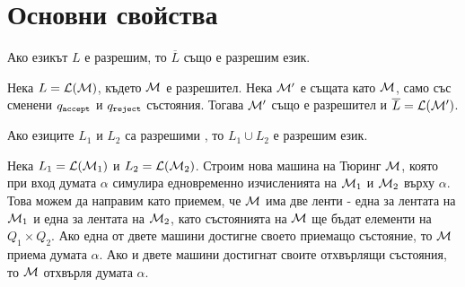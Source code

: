 \section{Основни свойства}

\begin{proposition}
  Ако езикът $L$ е разрешим, то $\overline{L}$ също е разрешим език.
\end{proposition}
\begin{hint}
  Нека $L = \mathcal{L}(\mathcal{M})$, където $\mathcal{M}$ е разрешител.
  Нека $\mathcal{M}'$ е същата като $\mathcal{M}$, само със сменени $q_{\texttt{accept}}$ и $q_{\texttt{reject}}$ състояния.
  Тогава $\mathcal{M}'$ също е разрешител и $\overline{L} = \mathcal{L}(\mathcal{M}')$.
\end{hint}

\begin{proposition}
  Ако езиците $L_1$ и $L_2$ са разрешими , то $L_1 \cup L_2$ е разрешим език.
\end{proposition}
\begin{hint}
  Нека $L_1 = \mathcal{L}(\mathcal{M}_1)$ и $L_2 = \mathcal{L}(\mathcal{M}_2)$.
  Строим нова машина на Тюринг $\mathcal{M}$, която при вход думата $\alpha$
  симулира едновременно изчисленията на $\mathcal{M}_1$ и $\mathcal{M}_2$ върху $\alpha$.
  Това можем да направим като приемем, че $\mathcal{M}$ има две ленти - една за лентата на $\mathcal{M}_1$ и една за лентата на $\mathcal{M}_2$,
  като състоянията на $\mathcal{M}$ ще бъдат елементи на $Q_1 \times Q_2$.
  Ако една от двете машини достигне своето приемащо състояние, то $\mathcal{M}$ приема думата $\alpha$.
  Ако и двете машини достигнат своите отхвърлящи състояния, то $\mathcal{M}$ отхвърля думата $\alpha$.
\end{hint}


